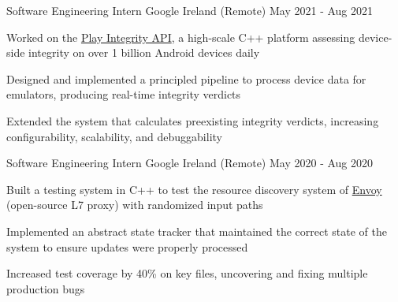 \begin{cventries}
  \cventry
    {Software Engineering Intern}
    {Google}
    {Ireland (Remote)}
    {May 2021 - Aug 2021}
    {
      \begin{cvitems}
        \item Worked on the \href{https://developer.android.com/google/play/integrity}{Play Integrity API}, a high-scale C++ platform assessing device-side integrity on over 1 billion Android devices daily
		\item Designed and implemented a principled pipeline to process device data for emulators, producing real-time integrity verdicts
        \item Extended the system that calculates preexisting integrity verdicts, increasing configurability, scalability, and debuggability
      \end{cvitems}
    }

  \cventry
    {Software Engineering Intern}
    {Google}
    {Ireland (Remote)}
    {May 2020 - Aug 2020}
    {
      \begin{cvitems}
		\item Built a testing system in C++ to test the resource discovery system of \href{https://github.com/envoyproxy/envoy}{Envoy} (open-source L7 proxy) with randomized input paths
        \item Implemented an abstract state tracker that maintained the correct state of the system to ensure updates were properly processed
		\item Increased test coverage by 40\% on key files, uncovering and fixing multiple production bugs
      \end{cvitems}
    }

\end{cventries}
